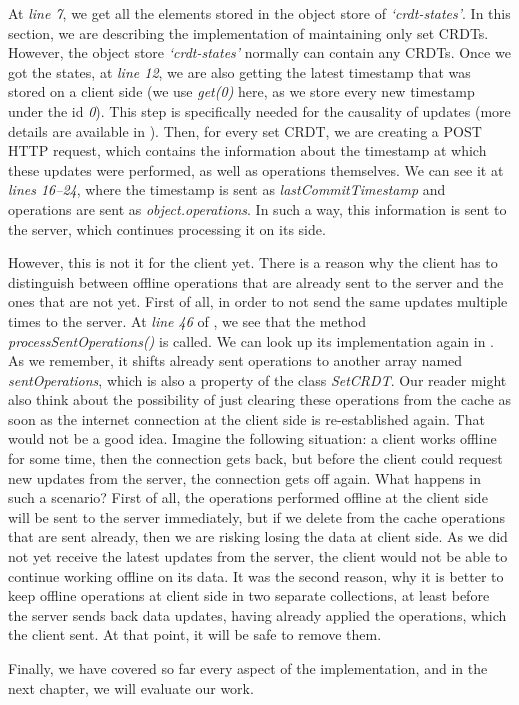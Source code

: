 At \textit{line 7}, we get all the elements stored in the object store of \textit{`crdt-states'}. In this section, we are describing the implementation of maintaining only set CRDTs. However, the object store \textit{`crdt-states'} normally can contain any CRDTs. Once we got the states, at \textit{line 12}, we are also getting the latest timestamp that was stored on a client side (we use \textit{get(0)} here, as we store every new timestamp under the id \textit{0}). This step is specifically needed for the causality of updates (more details are available in ). Then, for every set CRDT, we are creating a POST HTTP request, which contains the information about the timestamp at which these updates were performed, as well as operations themselves. We can see it at \textit{lines 16--24}, where the timestamp is sent as \textit{lastCommitTimestamp} and operations are sent as \textit{object.operations}. In such a way, this information is sent to the server, which continues processing it on its side.

However, this is not it for the client yet. There is a reason why the client has to distinguish between offline operations that are already sent to the server and the ones that are not yet. First of all, in order to not send the same updates multiple times to the server. At \textit{line 46} of , we see that the method \textit{processSentOperations()} is called. We can look up its implementation again in . As we remember, it shifts already sent operations to another array named \textit{sentOperations}, which is also a property of the class \textit{SetCRDT}. Our reader might also think about the possibility of just clearing these operations from the cache as soon as the internet connection at the client side is re-established again. That would not be a good idea. Imagine the following situation: a client works offline for some time, then the connection gets back, but before the client could request new updates from the server, the connection gets off again. What happens in such a scenario? First of all, the operations performed offline at the client side will be sent to the server immediately, but if we delete from the cache operations that are sent already, then we are risking losing the data at client side. As we did not yet receive the latest updates from the server, the client would not be able to continue working offline on its data. It was the second reason, why it is better to keep offline operations at client side in two separate collections, at least before the server sends back data updates, having already applied the operations, which the client sent. At that point, it will be safe to remove them.

Finally, we have covered so far every aspect of the implementation, and in the next chapter, we will evaluate our work.